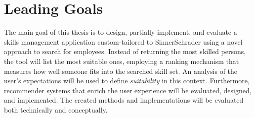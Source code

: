 \newpage

\section{Leading Goals}
The main goal of this thesis is to design, partially implement, and evaluate a skills management application custom-tailored to SinnerSchrader using a novel approach to search for employees. Instead of returning the most skilled persons, the tool will list the most suitable ones, employing a ranking mechanism that measures how well someone fits into the searched skill set. An analysis of the user's expectations will be used to define \textit{suitability} in this context.
Furthermore, recommender systems that enrich the user experience will be evaluated, designed, and implemented.
The created methods and implementations will be evaluated both technically and conceptually.
